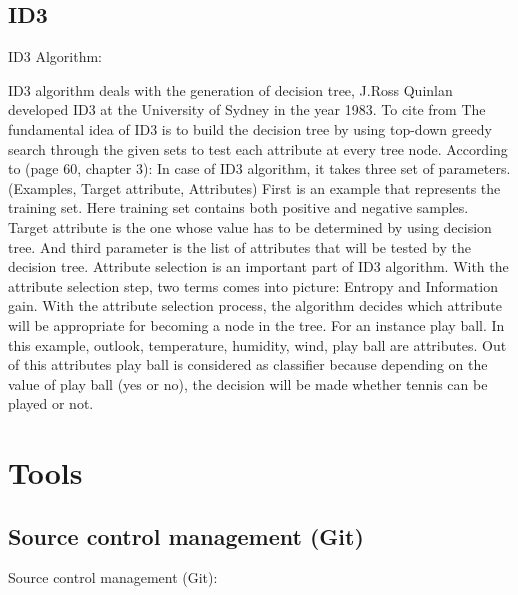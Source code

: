 \documentclass{article}
\begin{document}
\subsection{ID3}
\label{sec:ID3}

ID3 Algorithm:

ID3 algorithm deals with the generation of decision tree, J.Ross Quinlan developed ID3 at the University of Sydney in the year 1983. To cite from \cite{OverviewOfDecisionTrees}
The fundamental idea of ID3 is to build the decision tree by using top-down greedy search through the given sets to test each attribute at every tree node.
According to \cite{Mitchell1997MachineLearning}(page 60, chapter 3): In case of ID3 algorithm, it takes three set of parameters.
(Examples, Target attribute, Attributes)
First is an example that represents the training set. Here training set contains both positive and negative samples. Target attribute is the one whose value has to be determined by using decision tree. And third parameter is the list of attributes that will be tested by the decision tree. Attribute selection is an important part of ID3 algorithm. With the attribute selection step, two terms comes into picture: Entropy and Information gain. With the attribute selection process, the algorithm decides which attribute will be appropriate for becoming a node in the tree.
For an instance play ball. In this example, outlook, temperature, humidity, wind, play ball are attributes. Out of this attributes play ball is considered as classifier because depending on the value of play ball (yes or no), the decision will be made whether tennis can be played or not.


\section{Tools}
\label{sec:Tools}

\subsection{Source control management (Git)}
\label{sec:scm}

Source control management (Git):
\end{document}
